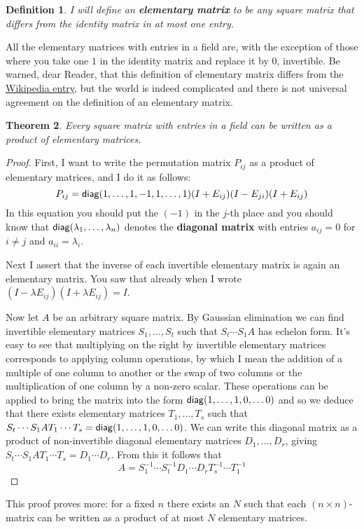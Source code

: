\documentclass[11pt]{amsbook}
\newtheorem{theorem}{Theorem}[section]
\newtheorem{definition}[theorem]{Definition}
\theoremstyle{definition}
\begin{document}
\begin{definition}
I will define an {\bf elementary matrix} to be any square matrix that differs from the identity matrix in at most one entry.
\end{definition}
All the elementary matrices with entries in a field are, with the exception of those where you take one $1$ in the identity matrix and replace it by $0$, invertible. Be warned, dear Reader, that this definition of elementary matrix differs from the \href{http://en.wikipedia.org/wiki/Elementary_matrix}{Wikipedia entry}, but the world is indeed complicated and there is not universal agreement on the definition of an elementary matrix.

\begin{theorem}\label{elmove} Every square matrix with entries in a field can be written as a product of elementary matrices.
\end{theorem}

\begin{proof}
First, I want to write the permutation matrix $P_{ij}$ as a product of elementary matrices, and I do it as follows:
$$P_{ij} = {\sf diag}(1,\ldots , 1, -1, 1, \ldots , 1) (I+E_{ij})(I-E_{ji})(I+E_{ij})$$ In this equation you should put the $(-1)$ in the $j$-th place and you should know that ${\sf diag}(\lambda_1, \ldots , \lambda_n)$ denotes the {\bf diagonal matrix} with entries $a_{ij} = 0$ for $i\neq j$ and $a_{ii} = \lambda_i$.

Next I assert that the inverse of each invertible elementary matrix is again an elementary matrix. You saw that already when I wrote $(I-\lambda E_{ij}) (I+\lambda E_{ij}) = I$.

Now let $A$ be an arbitrary square matrix. By Gaussian elimination we can find invertible elementary matrices $S_1, \ldots , S_t$ such that $S_t \cdots S_1 A$ has echelon form. It's easy to see that multiplying on the right by invertible elementary matrices corresponds to applying column operations, by which I mean the addition of a multiple of one column to another or the swap of two columns or the multiplication of one column by a non-zero scalar. These operations can be applied to bring the matrix into the form ${\sf diag}(1,\ldots , 1, 0 , \ldots 0)$ and so we deduce that there exists elementary matrices $T_1, \ldots , T_s$ such that $S_t\cdots S_1 A T_1\cdots T_s  = {\sf diag}(1,\ldots , 1, 0 , \ldots 0)$. We can write this diagonal matrix as a product of non-invertible diagonal elementary matrices $D_1, \ldots , D_r$, giving $S_t\cdots S_1 A T_1\cdots T_s = D_1 \cdots D_r$. From this it follows that $$A =  S_1^{-1}\cdots S_t^{-1} D_1\cdots D_r T_s^{-1}\cdots T_1^{-1}$$
\end{proof}
This proof proves more: for a fixed $n$ there exists an $N$ such that each $(n\times n)$-matrix can be written as a product of at most $N$ elementary matrices.
\end{document}
